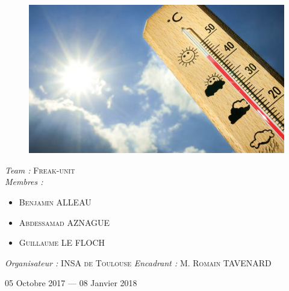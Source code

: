 \documentclass[14pt, openany]{article}
\begin{document}
\begin{titlepage}
\begin{center}
\begin{figure}[h]
\begin{minipage}[c]{.46\linewidth}
    \end{minipage}
    \hfill%
    \begin{minipage}[c]{.46\linewidth}
        \centering
        \includegraphics[scale=0.36]{Images/temp.jpg}
    \end{minipage}
	\end{figure}
    \bigskip
    \begin{minipage}{0.4\textwidth}
      \begin{flushleft} \large
      \emph{Team :} \textsc{Freak-unit}\\
      \emph{Membres :}
      \begin{itemize}
      	\item \textsc{Benjamin ALLEAU}\\
      	\item \textsc{Abdessamad AZNAGUE}\\
        \item \textsc{Guillaume LE FLOCH}\\
      \end{itemize}
      \end{flushleft}
    \end{minipage}
    \begin{minipage}{0.4\textwidth}
      \begin{flushright} \large
      	\emph{Organisateur :} \textsc{INSA de Toulouse}
        \emph{Encadrant :} \textsc{M. Romain TAVENARD}\\         
      \end{flushright}
    \end{minipage}

    \vfill
    
    {\large 05 Octobre 2017 —  08 Janvier 2018}

\end{center}
\end{titlepage}
\end{document}
